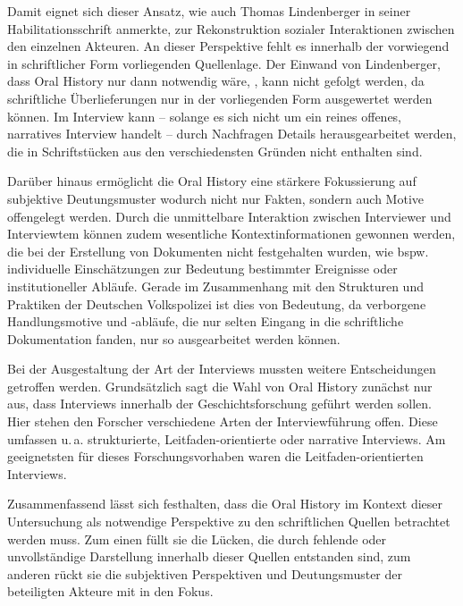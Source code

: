 Damit eignet sich dieser Ansatz, wie auch Thomas Lindenberger in seiner Habilitationsschrift\autocite[33]{Lindenberger2003} anmerkte, zur Rekonstruktion sozialer Interaktionen zwischen den einzelnen Akteuren. 
An dieser Perspektive fehlt es innerhalb der vorwiegend in schriftlicher Form vorliegenden Quellenlage. 
Der Einwand von Lindenberger, dass Oral History nur dann notwendig wäre, \autocite[33]{Lindenberger2003}, kann nicht gefolgt werden, da schriftliche Überlieferungen nur in der vorliegenden Form ausgewertet werden können. 
Im Interview kann -- solange es sich nicht um ein reines offenes, narratives Interview handelt -- durch Nachfragen Details herausgearbeitet werden, die in Schriftstücken aus den verschiedensten Gründen nicht enthalten sind.\par 
Darüber hinaus ermöglicht die Oral History eine stärkere Fokussierung auf subjektive Deutungsmuster wodurch nicht nur Fakten, sondern auch Motive offengelegt werden.
Durch die unmittelbare Interaktion zwischen Interviewer und Interviewtem können zudem wesentliche Kontextinformationen gewonnen werden, die bei der Erstellung von Dokumenten nicht festgehalten wurden, wie bspw. individuelle Einschätzungen zur Bedeutung bestimmter Ereignisse oder institutioneller Abläufe. 
Gerade im Zusammenhang mit den Strukturen und Praktiken der Deutschen Volkspolizei ist dies von Bedeutung, da verborgene Handlungsmotive und -abläufe, die nur selten Eingang in die schriftliche Dokumentation fanden, nur so ausgearbeitet werden können.\par 
Bei der Ausgestaltung der Art der Interviews mussten weitere Entscheidungen getroffen werden. 
Grundsätzlich sagt die Wahl von Oral History zunächst nur aus, dass Interviews innerhalb der Geschichtsforschung geführt werden sollen.
Hier stehen den Forscher verschiedene Arten der Interviewführung offen.
Diese umfassen u.\,a. strukturierte, Leitfaden-orientierte oder narrative Interviews.
Am geeignetsten für dieses Forschungsvorhaben waren die Leitfaden-orientierten Interviews. 




Zusammenfassend lässt sich festhalten, dass die Oral History im Kontext dieser Untersuchung als notwendige Perspektive zu den schriftlichen Quellen betrachtet werden muss. 
Zum einen füllt sie die Lücken, die durch fehlende oder unvollständige Darstellung innerhalb dieser Quellen entstanden sind, zum anderen rückt sie die subjektiven Perspektiven und Deutungsmuster der beteiligten Akteure mit in den Fokus. 


